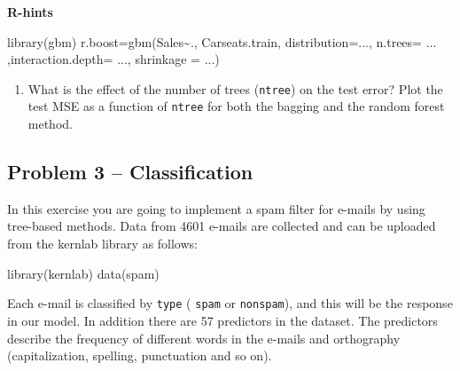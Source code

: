 \documentclass[
]{article}
\newenvironment{Shaded}{\begin{snugshade}}{\end{snugshade}}
\newcommand{\AttributeTok}[1]{\textcolor[rgb]{0.77,0.63,0.00}{#1}}
\newcommand{\FunctionTok}[1]{\textcolor[rgb]{0.00,0.00,0.00}{#1}}
\newcommand{\NormalTok}[1]{#1}
\newcommand{\OtherTok}[1]{\textcolor[rgb]{0.56,0.35,0.01}{#1}}
\newcommand{\SpecialCharTok}[1]{\textcolor[rgb]{0.00,0.00,0.00}{#1}}
\providecommand{\tightlist}{%
  \setlength{\itemsep}{0pt}\setlength{\parskip}{0pt}}
\begin{document}
\textbf{R-hints}

\begin{Shaded}
\begin{Highlighting}[]
\FunctionTok{library}\NormalTok{(gbm)}
\NormalTok{r.boost}\OtherTok{=}\FunctionTok{gbm}\NormalTok{(Sales}\SpecialCharTok{\textasciitilde{}}\NormalTok{., Carseats.train,}
                 \AttributeTok{distribution=}\NormalTok{...,}
                 \AttributeTok{n.trees=}\NormalTok{ ... ,}\AttributeTok{interaction.depth=}\NormalTok{ ..., }\AttributeTok{shrinkage =}\NormalTok{ ...)}
\end{Highlighting}
\end{Shaded}

\begin{enumerate}
\def\labelenumi{\alph{enumi})}
\setcounter{enumi}{6}
\tightlist
\item
  What is the effect of the number of trees (\texttt{ntree}) on the test
  error? Plot the test MSE as a function of \texttt{ntree} for both the
  bagging and the random forest method.
\end{enumerate}

\hypertarget{problem-3-classification}{%
\subsection{Problem 3 --
Classification}\label{problem-3-classification}}

In this exercise you are going to implement a spam filter for e-mails by
using tree-based methods. Data from 4601 e-mails are collected and can
be uploaded from the kernlab library as follows:

\begin{Shaded}
\begin{Highlighting}[]
\FunctionTok{library}\NormalTok{(kernlab)}
\FunctionTok{data}\NormalTok{(spam)}
\end{Highlighting}
\end{Shaded}

Each e-mail is classified by \texttt{type} ( \texttt{spam} or
\texttt{nonspam}), and this will be the response in our model. In
addition there are 57 predictors in the dataset. The predictors describe
the frequency of different words in the e-mails and orthography
(capitalization, spelling, punctuation and so on).
\end{document}
